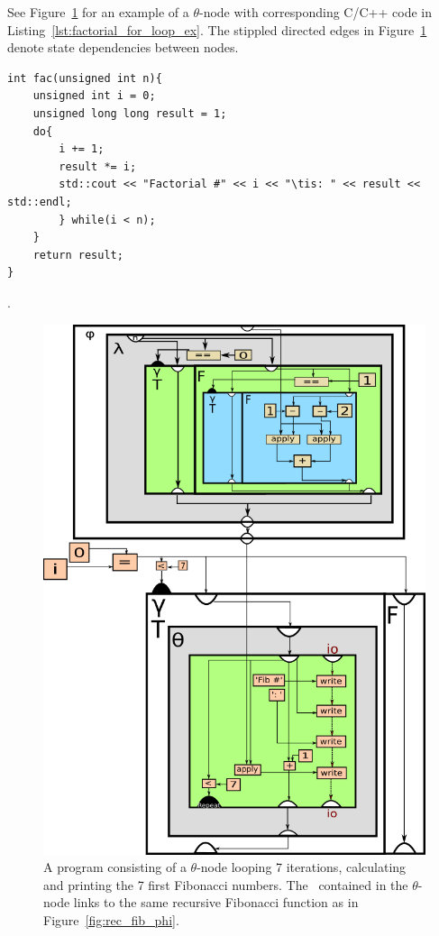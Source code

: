 \begin{itemize}
See Figure~\ref{fig:factorial_for_loop_ex} for an example of a $\theta$-node
with corresponding C/C++ code in Listing~\ref{lst:factorial_for_loop_ex}.
The stippled directed edges in Figure~\ref{fig:factorial_for_loop_ex} denote
state dependencies between nodes.

\begin{lstlisting}[label={lst:for_loop_rec_fib_print_ex}, style=global_customcpp,
caption={C/C++ code corresponding to the RVSDG subgraph in
Figure~\ref{fig:factorial_for_loop_ex}.}]
int fac(unsigned int n){
	unsigned int i = 0;
	unsigned long long result = 1;
	do{
		i += 1;
		result *= i;
		std::cout << "Factorial #" << i << "\tis: " << result << std::endl;
		} while(i < n);
	}
	return result;
}
\end{lstlisting}
\vspace{-4\parskip} %
.
\newpage

\begin{figure}[ht!]
	\centering
	\includegraphics[width=\textwidth]{figures/for-loop-printf-rec_fib-example}
	\caption{A program consisting of a $\theta$-node looping 7 iterations,
calculating and printing the 7 first Fibonacci numbers. The \applyNode ~contained
in the $\theta$-node links to the same recursive Fibonacci function as in
Figure~\ref{fig:rec_fib_phi}.}
	\label{fig:factorial_for_loop_ex}
\end{figure}


\end{itemize}
